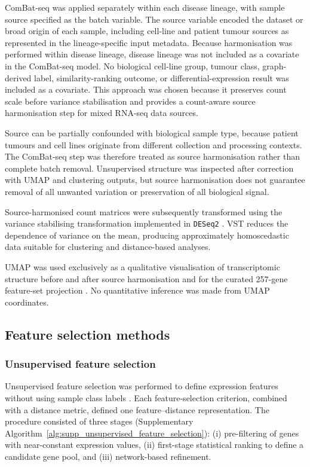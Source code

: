 ComBat-seq was applied separately within each disease lineage, with sample
source specified as the batch variable. The source variable encoded the
dataset or broad origin of each sample, including cell-line and patient tumour
sources as represented in the lineage-specific input metadata. Because
harmonisation was performed within disease lineage, disease lineage was not
included as a covariate in the ComBat-seq model. No biological cell-line group,
tumour class, graph-derived label, similarity-ranking outcome, or
differential-expression result was included as a covariate. This approach was
chosen because it preserves count scale before variance stabilisation and
provides a count-aware source harmonisation step for mixed RNA-seq data sources.

Source can be partially confounded with biological sample type, because
patient tumours and cell lines originate from different collection and
processing contexts. The ComBat-seq step was therefore treated as source
harmonisation rather than complete batch removal. Unsupervised structure was
inspected after correction with UMAP and clustering outputs, but source
harmonisation does not guarantee removal of all unwanted variation or
preservation of all biological signal.

Source-harmonised count matrices were subsequently transformed using the
variance stabilising transformation implemented in \texttt{DESeq2}
\citep{Love2014}. VST reduces the dependence of variance on the mean, producing
approximately homoscedastic data suitable for clustering and distance-based
analyses.

UMAP was used exclusively as a qualitative visualisation of transcriptomic
structure before and after source harmonisation and for the curated 257-gene
feature-set projection \citep{McInnes2020}. No quantitative inference was made
from UMAP coordinates.


\subsection{Feature selection methods}
\subsubsection{Unsupervised feature selection}

Unsupervised feature selection was performed to define expression features without using sample class labels \citep{Solorio-Fernandez2020}. Each feature-selection criterion, combined with a distance metric, defined one feature--distance representation. The procedure consisted of three stages (Supplementary
Algorithm~\ref{alg:supp_unsupervised_feature_selection}): (i) pre-filtering of genes with near-constant expression values, (ii) first-stage statistical ranking to define a candidate gene pool, and (iii) network-based refinement.

